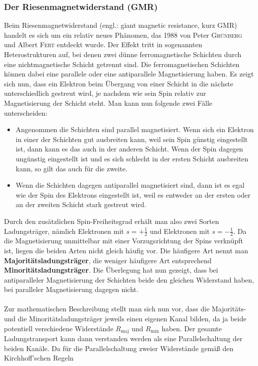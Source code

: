 \documentclass[german,  %
parskip=full,  %
]{scrartcl}
\begin{document}
\subsubsection{Der Riesenmagnetwiderstand (GMR)}
Beim Riesenmagnetwiderstand (engl.: giant magnetic resistance, kurz GMR) handelt es sich um ein relativ neues Phänomen, das 1988 von Peter \textsc{Grünberg} und Albert \textsc{Fert} entdeckt wurde. Der Effekt tritt in sogenannten Heterostrukturen auf, bei denen zwei dünne ferromagnetische Schichten durch eine nichtmagnetische Schicht getrennt sind. Die ferromagnetischen Schichten können dabei eine parallele oder eine antiparallele Magnetisierung haben. Es zeigt sich nun, dass ein Elektron beim Übergang von einer Schicht in die nächste unterschiedlich gestreut wird, je nachdem wie sein Spin relativ zur Magnetisierung der Schicht steht. Man kann nun folgende zwei Fälle unterscheiden:
\begin{itemize}
\item Angenommen die Schichten sind parallel magnetisiert. Wenn sich ein Elektron in einer der Schichten gut ausbreiten kann, weil sein Spin günstig eingestellt ist, dann kann es das auch in der anderen Schicht. Wenn der Spin dagegen ungünstig eingestellt ist und es sich schlecht in der ersten Schicht ausbreiten kann, so gilt das auch für die zweite.
\item Wenn die Schichten dagegen antiparallel magnetisiert sind, dann ist es egal wie der Spin des Elektrons eingestellt ist, weil es entweder an der ersten oder an der zweiten Schicht stark gestreut wird.
\end{itemize}
Durch den zusätzlichen Spin-Freiheitsgrad erhält man also zwei Sorten Ladungsträger, nämlich Elektronen mit \(s=+\frac{1}{2}\) und Elektronen mit \(s= -\frac{1}{2}\). Da die Magnetisierung unmittelbar mit einer Vorzugsrichtung der Spins verknüpft ist, liegen die beiden Arten nicht gleich häufig vor. Die häufigere Art nennt man \textbf{Majoritätsladungsträger}, die weniger häufigere Art entsprechend \textbf{Minoritätsladungsträger}. Die Überlegung hat nun gezeigt, dass bei antiparalleler Magnetisierung der Schichten beide den gleichen Widerstand haben, bei paralleler Magnetisierung dagegen nicht. \\\\
Zur mathematischen Beschreibung stellt man sich nun vor, dass die Majoritäts- und die Minoritätsladungsträger jeweils einen eigenen Kanal bilden, da ja beide potentiell verschiedene Widerstände \(R_{\mathrm{maj}}\) und \(R_{\mathrm{min}}\) haben. Der gesamte Ladungstransport kann dann verstanden werden als eine Parallelschaltung der beiden Kanäle. Da für die Parallelschaltung zweier Widerstände gemäß den Kirchhoff'schen Regeln
\end{document}
